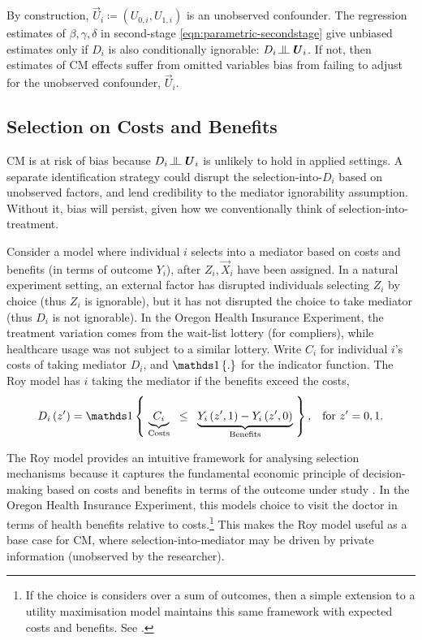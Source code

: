 By construction, $\vec U_i \coloneqq \left(U_{0, i}, U_{1, i} \right)$ is an unobserved confounder.
The regression estimates of $\beta, \gamma, \delta$ in second-stage \eqref{eqn:parametric-secondstage} give unbiased estimates only if $D_i$ is also conditionally ignorable: $D_i \indep  \vec U_{i} $.
If not, then estimates of CM effects suffer from omitted variables bias from failing to adjust for the unobserved confounder, $\vec U_i$.

\subsection{Selection on Costs and Benefits}
CM is at risk of bias because $D_i \indep  \vec U_i$ %
is unlikely to hold in applied settings.
A separate identification strategy could disrupt the selection-into-$D_i$ based on unobserved factors, and lend credibility to the mediator ignorability assumption.
Without it, bias will persist, given how we conventionally think of selection-into-treatment.

Consider a model where individual $i$ selects into a mediator based on costs and benefits (in terms of outcome $Y_i$), after $Z_i, \vec X_i$ have been assigned.
In a natural experiment setting, an external factor has disrupted individuals selecting $Z_i$ by choice (thus $Z_i$ is ignorable), but it has not disrupted the choice to take mediator (thus $D_i$ is not ignorable).
In the Oregon Health Insurance Experiment, the treatment variation comes from the wait-list lottery (for compliers), while healthcare usage was not subject to a similar lottery.
Write $C_i$ for individual $i$'s costs of taking mediator $D_i$, and $\indicator{.}$ for the indicator function.
The Roy model has $i$ taking the mediator if the benefits exceed the costs,
\begin{equation}
    \label{eqn:roy-model}
    D_i \left( z' \right) = \indicator{ \;
    \underbrace{C_i}_{\text{Costs}} \;\; \leq \;\;
        \underbrace{
            Y_i\left( z', 1 \right) - Y_i\left( z', 0 \right)}_{\text{Benefits}}
    \;}, \;\;\; \text{for } z'=0,1.
\end{equation}

The Roy model provides an intuitive framework for analysing selection mechanisms because it captures the fundamental economic principle of decision-making based on costs and benefits in terms of the outcome under study \citep{roy1951some,heckman1990empirical}.
In the Oregon Health Insurance Experiment, this models choice to visit the doctor in terms of health benefits relative to costs.\footnote{
    If the choice is considers over a sum of outcomes, then a simple extension to a utility maximisation model maintains this same framework with expected costs and benefits.
    See \cite{heckman1990empirical,eisenhauer2015generalized}.
}
This makes the Roy model useful as a base case for CM, where selection-into-mediator may be driven by private information (unobserved by the researcher).

